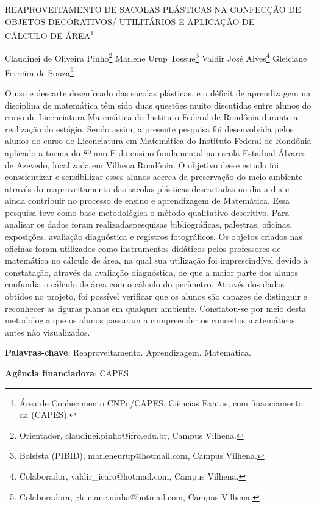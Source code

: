 \documentclass[article,12pt,onesidea,4paper,english,brazil]{abntex2}
\begin{document}
	
	
	\frenchspacing 
	
	\begin{center}
		\LARGE REAPROVEITAMENTO DE SACOLAS PLÁSTICAS NA CONFECÇÃO DE OBJETOS DECORATIVOS/ UTILITÁRIOS E APLICAÇÃO DE \\CÁLCULO DE ÁREA\footnote{Área de Conhecimento CNPq/CAPES, Ciências Exatas, com financiamento da (CAPES).}
		
		\normalsize
		Claudinei de Oliveira Pinho\footnote{Orientador, claudinei.pinho@ifro.edu.br, Campus Vilhena.} 
		Marlene Urup Tossue\footnote{Bolsista (PIBID), marleneurup@hotmail.com, Campus Vilhena.} 
		Valdir José Alves\footnote{Colaborador, valdir\_icaro@hotmail.com, Campus Vilhena.} 
		Gleiciane Ferreira de Souza\footnote{Colaboradora, gleiciane.ninha@hotmail.com, Campus Vilhena.} 
	\end{center}
	
	\noindent O uso e descarte desenfreado das sacolas plásticas, e o déficit de aprendizagem na disciplina de matemática têm sido duas questões muito discutidas entre alunos do curso de Licenciatura Matemática do Instituto Federal de Rondônia durante a realização do estágio. Sendo assim, a presente pesquisa foi desenvolvida pelos alunos do curso de Licenciatura em Matemática do Instituto Federal de Rondônia aplicado a turma do 8º ano E do ensino fundamental na escola Estadual Álvares de Azevedo, localizada em Vilhena Rondônia. O objetivo desse estudo foi conscientizar e sensibilizar esses alunos acerca da preservação do meio ambiente através do reaproveitamento das sacolas plásticas descartadas no dia a dia e ainda contribuir no processo de ensino e aprendizagem de Matemática. Essa pesquisa teve como base metodológica o método qualitativo descritivo. Para analisar os dados foram realizadaspesquisas bibliográficas, palestras, oficinas, exposições, avaliação diagnóstica e registros fotográficos. Os objetos criados nas oficinas foram utilizados como instrumentos didáticos pelos professores de matemática no cálculo de área, na qual sua utilização foi imprescindível devido à constatação, através da avaliação diagnóstica, de que a maior parte dos alunos confundia o cálculo de área com o cálculo do perímetro. Através dos dados obtidos no projeto, foi possível verificar que os alunos são capazes de distinguir e reconhecer as figuras planas em qualquer ambiente. Constatou-se por meio desta metodologia que os alunos passaram a compreender os conceitos matemáticos antes não visualizados.
	
	\vspace{\onelineskip}
	
	\noindent
	\textbf{Palavras-chave}: Reaproveitamento. Aprendizagem. Matemática.
	
	\noindent
	\textbf{Agência financiadora}: CAPES
	
\end{document}
